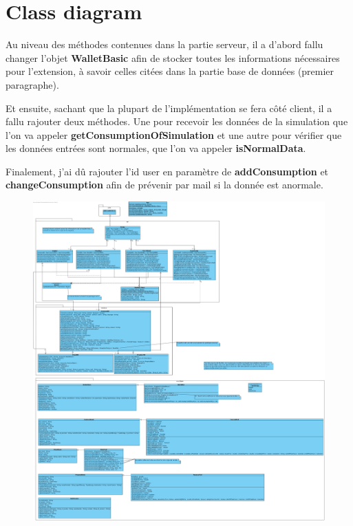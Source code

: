 \section{Class diagram}

\begin{flushleft}
Au niveau des méthodes contenues dans la partie serveur, il a d'abord fallu changer l'objet \textbf{WalletBasic} afin de stocker toutes les informations nécessaires pour l'extension, à savoir celles citées dans la partie base de données (premier paragraphe).
\end{flushleft}

\begin{flushleft}
Et ensuite, sachant que la plupart de l'implémentation se fera côté client, il a fallu rajouter deux méthodes. Une pour recevoir les données de la simulation que l'on va appeler \textbf{getConsumptionOfSimulation} et une autre pour vérifier que les données entrées sont normales, que l'on va appeler \textbf{isNormalData}.
\end{flushleft}

\begin{flushleft}
Finalement, j'ai dû rajouter l'id user en paramètre de \textbf{addConsumption} et \textbf{changeConsumption} afin de prévenir par mail si la donnée est anormale.
\end{flushleft}

\newpage
\begin{figure}[h]
\centering
\includegraphics[width=1\textwidth]{extension-adrien/ClassDiagram/img/classDiagram.png}
\end{figure}
